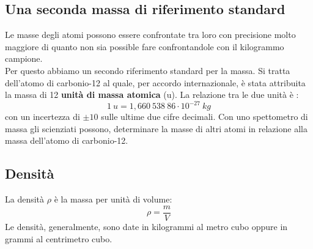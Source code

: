 \documentclass[12pt]{report}
\begin{document}
	\subsection{Una seconda massa di riferimento standard}
	Le masse degli atomi possono essere confrontate tra loro con precisione molto maggiore di quanto non sia possible fare confrontandole con il kilogrammo campione. \\
	Per questo abbiamo un secondo riferimento standard per la massa. Si tratta dell'atomo di carbonio-12 al quale, per accordo internazionale, è  stata attribuita la massa di 12 \textbf{unità di massa atomica} (u). La relazione tra le due unità è :
	\[
	1\ u = 1, 660\ 538\ 86 \cdot 10^{-27}\ kg
	\]
	con un incertezza di $\pm 10$ sulle ultime due cifre decimali. Con uno spettometro di massa gli scienziati possono, determinare la masse di altri atomi in relazione alla massa dell'atomo di carbonio-12.
	\subsection{Densità}
	La densità $\rho$ è  la massa per unità di volume:
	\[
	\rho = \frac{m}{V}
	\]
	Le densità, generalmente, sono date in kilogrammi al metro cubo oppure in grammi al centrimetro cubo.
\end{document}
